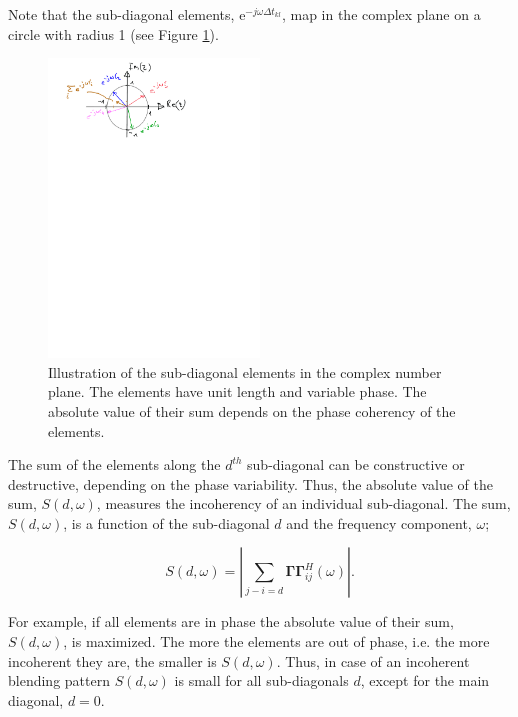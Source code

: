 Note that the sub-diagonal elements, $\mathrm{e}^{-j \omega \Delta t_{kl}}$, map in the complex plane on a circle with radius 1 (see Figure \ref{fig:Ch-Results-complex-circle}). 

\begin{figure}
	\centering
	\includegraphics[width = 0.5\textwidth]{Plots/complex-circle}
	\caption{Illustration of the sub-diagonal elements in the complex number plane. The elements have unit length and variable phase. The absolute value of their sum depends on the phase coherency of the elements.}
	\label{fig:Ch-Results-complex-circle}
\end{figure}

The sum of the elements along the $d^{th}$ sub-diagonal can be constructive or destructive, depending on the phase variability. Thus, the absolute value of the sum, $S(d,\omega)$, measures the incoherency of an individual sub-diagonal. The sum, $S(d,\omega)$, is a function of the sub-diagonal $d$ and the frequency component, $\omega$;


\begin{equation}
	S(d,\omega) = \left| \sum_{j-i=d} \mathbf{\Gamma \Gamma}^H_{ij} (\omega) \right|.
	\label{eq:Ch-Results-incoherency-diagsum}	
\end{equation} 

For example, if all elements are in phase the absolute value of their sum, $S(d,\omega)$, is maximized. The more the elements are out of phase, i.e. the more incoherent they are, the smaller is $S(d,\omega)$. Thus, in case of an incoherent blending pattern $S(d,\omega)$ is small for all sub-diagonals $d$, except for the main diagonal, $d = 0$.  

